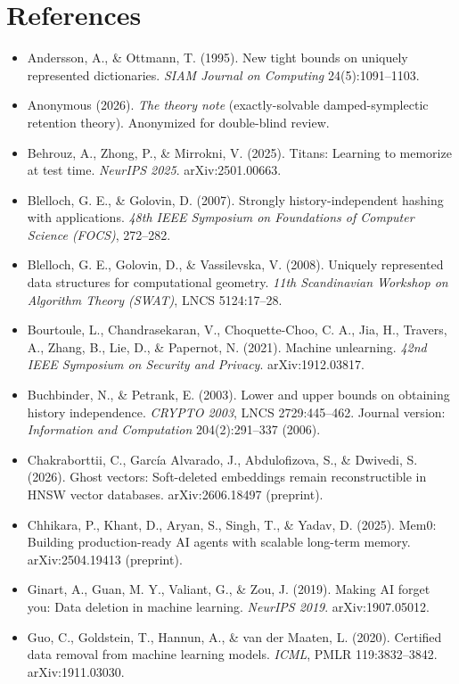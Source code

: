 
\clearpage
\appendix
\footnotesize

\section*{References}
{\tiny\begin{itemize}\itemsep0pt \parskip0pt
\item Andersson, A., \& Ottmann, T. (1995). New tight bounds on uniquely represented dictionaries. \emph{SIAM Journal on Computing} 24(5):1091--1103.
\item Anonymous (2026). \emph{The theory note} (exactly-solvable damped-symplectic retention theory). Anonymized for double-blind review.
\item Behrouz, A., Zhong, P., \& Mirrokni, V. (2025). Titans: Learning to memorize at test time. \emph{NeurIPS 2025}. arXiv:2501.00663.
\item Blelloch, G. E., \& Golovin, D. (2007). Strongly history-independent hashing with applications. \emph{48th IEEE Symposium on Foundations of Computer Science (FOCS)}, 272--282.
\item Blelloch, G. E., Golovin, D., \& Vassilevska, V. (2008). Uniquely represented data structures for computational geometry. \emph{11th Scandinavian Workshop on Algorithm Theory (SWAT)}, LNCS 5124:17--28.
\item Bourtoule, L., Chandrasekaran, V., Choquette-Choo, C. A., Jia, H., Travers, A., Zhang, B., Lie, D., \& Papernot, N. (2021). Machine unlearning. \emph{42nd IEEE Symposium on Security and Privacy}. arXiv:1912.03817.
\item Buchbinder, N., \& Petrank, E. (2003). Lower and upper bounds on obtaining history independence. \emph{CRYPTO 2003}, LNCS 2729:445--462. Journal version: \emph{Information and Computation} 204(2):291--337 (2006).
\item Chakraborttii, C., Garc\'ia Alvarado, J., Abdulofizova, S., \& Dwivedi, S. (2026). Ghost vectors: Soft-deleted embeddings remain reconstructible in HNSW vector databases. arXiv:2606.18497 (preprint).
\item Chhikara, P., Khant, D., Aryan, S., Singh, T., \& Yadav, D. (2025). Mem0: Building production-ready AI agents with scalable long-term memory. arXiv:2504.19413 (preprint).
\item Ginart, A., Guan, M. Y., Valiant, G., \& Zou, J. (2019). Making AI forget you: Data deletion in machine learning. \emph{NeurIPS 2019}. arXiv:1907.05012.
\item Guo, C., Goldstein, T., Hannun, A., \& van der Maaten, L. (2020). Certified data removal from machine learning models. \emph{ICML}, PMLR 119:3832--3842. arXiv:1911.03030.

\end{itemize}}
